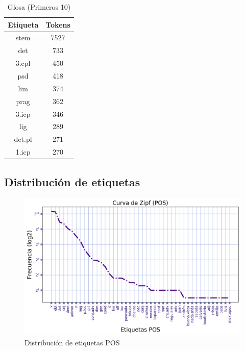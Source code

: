 \documentclass[letterpaper,12pt,oneside]{book}
\begin{document}
	\begin{table}

		\centering

		\begin{tabular}{c | c}                            

			\textbf{Etiqueta} & \textbf{Tokens} \\ \hline \hline

			stem & 7527 \\

			det & 733 \\

			3.cpl & 450 \\

			psd & 418 \\

			lim & 374 \\

			prag & 362 \\

			3.icp & 346 \\

			lig & 289 \\

			det.pl & 271 \\

			1.icp & 270 \\

		\end{tabular}

		\caption{Glosa (Primeros 10)}

		\label{table_gloss_tokens}

	\end{table}

	
	


	\subsection{Distribución de etiquetas}

	
	\begin{figure}

		\centering

		\includegraphics[width=\textwidth]{zipf_pos}

		\caption{Distribución de etiquetas POS}

	\end{figure}
\end{document}

